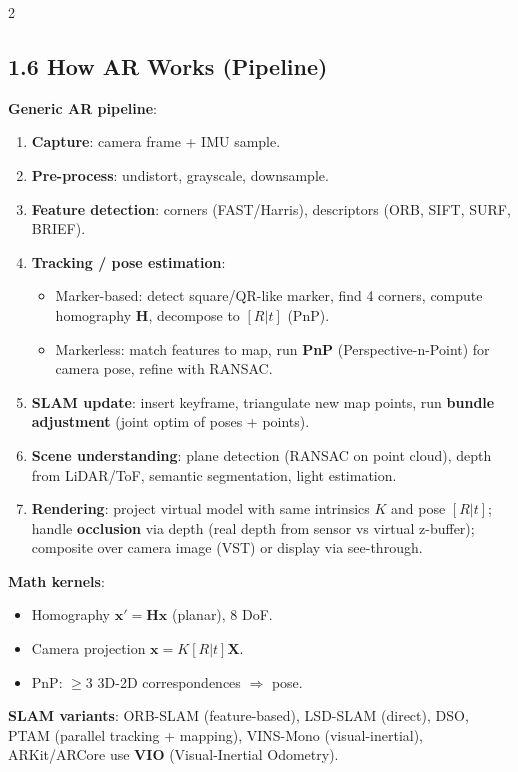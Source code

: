 \begin{paracol}{2}
\subsection*{1.6 How AR Works (Pipeline)}
\textbf{Generic AR pipeline}:
\begin{enumerate}[leftmargin=*,nosep]
  \item \textbf{Capture}: camera frame + IMU sample.
  \item \textbf{Pre-process}: undistort, grayscale, downsample.
  \item \textbf{Feature detection}: corners (FAST/Harris), descriptors (ORB, SIFT, SURF, BRIEF).
  \item \textbf{Tracking / pose estimation}:
    \begin{itemize}[nosep]
      \item Marker-based: detect square/QR-like marker, find 4 corners, compute homography $\mathbf{H}$, decompose to $[R|t]$ (PnP).
      \item Markerless: match features to map, run \textbf{PnP} (Perspective-n-Point) for camera pose, refine with RANSAC.
    \end{itemize}
  \item \textbf{SLAM update}: insert keyframe, triangulate new map points, run \textbf{bundle adjustment} (joint optim of poses + points).
  \item \textbf{Scene understanding}: plane detection (RANSAC on point cloud), depth from LiDAR/ToF, semantic segmentation, light estimation.
  \item \textbf{Rendering}: project virtual model with same intrinsics $K$ and pose $[R|t]$; handle \textbf{occlusion} via depth (real depth from sensor vs virtual z-buffer); composite over camera image (VST) or display via see-through.
\end{enumerate}
\textbf{Math kernels}:
\begin{itemize}[leftmargin=*,nosep]
  \item Homography $\mathbf{x'} = \mathbf{H}\mathbf{x}$ (planar), 8 DoF.
  \item Camera projection $\mathbf{x} = K[R|t]\mathbf{X}$.
  \item PnP: $\geq 3$ 3D-2D correspondences $\Rightarrow$ pose.
\end{itemize}
\textbf{SLAM variants}: ORB-SLAM (feature-based), LSD-SLAM (direct), DSO, PTAM (parallel tracking + mapping), VINS-Mono (visual-inertial), ARKit/ARCore use \textbf{VIO} (Visual-Inertial Odometry).


\end{paracol}
